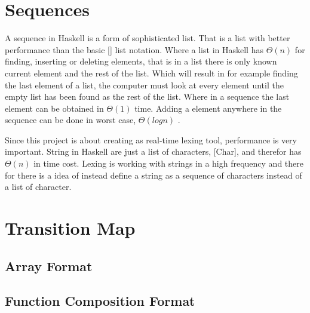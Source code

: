 \section{Sequences}
A sequence in Haskell is a form of sophisticated list. That is a list with better performance than the basic [] list notation. Where a list in Haskell has $\Theta(n)$ for finding, inserting or deleting elements, that is in a list there is only known current element and the rest of the list. Which will result in for example finding the last element of a list, the computer must look at every element until the empty list has been found as the rest of the list. Where in a sequence the last element can be obtained in $\Theta(1)$ time. Adding a element anywhere in the sequence can be done in worst case, $\Theta(log n)$ \cite{fingertree}. 

Since this project is about creating as real-time lexing tool, performance is very important. String in Haskell are just a list of characters, [Char], and therefor has $\Theta(n)$ in time cost. Lexing is working with strings in a high frequency and there for there is a idea of instead define a string as a sequence of characters instead of a list of character. 

\section{Transition Map}
\subsection{Array Format}
\subsection{Function Composition Format}

